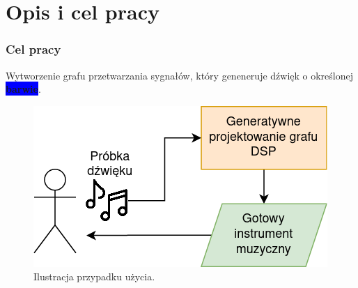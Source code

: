 \documentclass[]{beamer}
\begin{document}


\section{Opis i cel pracy}
\begin{frame}
  \frametitle{Cel pracy}

  \centering
  \Large
    Wytworzenie grafu przetwarzania sygnałów, który geneneruje dźwięk o określonej \colorbox{blue}{\color{white}\textbf{barwie}}.


    \begin{figure}
      \centering
      \includegraphics[width=0.4\linewidth]{use_case_diagram.png}
      \caption{Ilustracja przypadku użycia.}
    \end{figure}

\end{frame}
\end{document}
